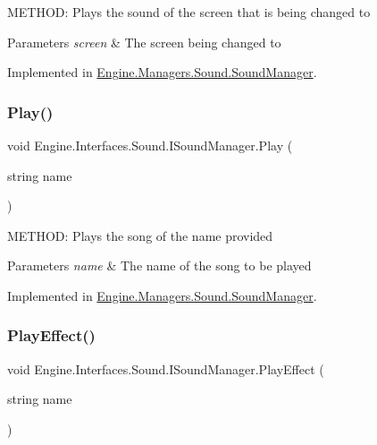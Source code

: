 M\+E\+T\+H\+OD\+: Plays the sound of the screen that is being changed to 


\begin{DoxyParams}{Parameters}
{\em screen} & The screen being changed to\\
\hline
\end{DoxyParams}


Implemented in \hyperlink{a00546_a8dfbb15525871b87e6cdcf744b070139}{Engine.\+Managers.\+Sound.\+Sound\+Manager}.

\mbox{\label{a00482_aec02346c5397b9b01b9d5d6baedc923e}} 
\subsubsection{\texorpdfstring{Play()}{Play()}}
{\footnotesize\ttfamily void Engine.\+Interfaces.\+Sound.\+I\+Sound\+Manager.\+Play (\begin{DoxyParamCaption}\item[{string}]{name }\end{DoxyParamCaption})}



M\+E\+T\+H\+OD\+: Plays the song of the name provided 


\begin{DoxyParams}{Parameters}
{\em name} & The name of the song to be played\\
\hline
\end{DoxyParams}


Implemented in \hyperlink{a00546_aabfeb911d8bd573065e9c02d3f81e582}{Engine.\+Managers.\+Sound.\+Sound\+Manager}.

\mbox{\label{a00482_aa9e2fb77a5fe624ce65373f5ee8328ae}} 
\subsubsection{\texorpdfstring{Play\+Effect()}{PlayEffect()}}
{\footnotesize\ttfamily void Engine.\+Interfaces.\+Sound.\+I\+Sound\+Manager.\+Play\+Effect (\begin{DoxyParamCaption}\item[{string}]{name }\end{DoxyParamCaption})}



